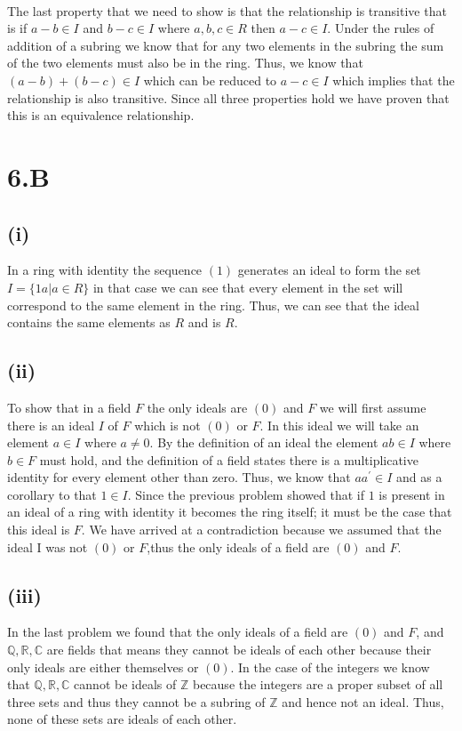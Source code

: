 \documentclass{article}
\begin{document}
      \paragraph{} The last property that we need to show is that the relationship is transitive that is if $a-b \in I$ and $b-c \in I$ where $a,b,c \in R$ then $a-c \in I$. Under the rules of addition of a subring we know that for any two elements in the subring the sum of the two elements must also be in the ring. Thus, we know that $(a-b) + (b-c) \in I$ which can be reduced to $a-c \in I$ which implies that the relationship is also transitive. Since all three properties hold we have proven that this is an equivalence relationship.

  \section*{6.B}
      \subsection*{(i)}
        In a ring with identity the sequence $(1)$ generates an ideal to form the set $I = \{1a | a \in R\}$ in that case we can see that every element in the set will correspond to the same element in the ring. Thus, we can see that the ideal contains the same elements as $R$ and is $R$.

      \subsection*{(ii)}
        To show that in a field $F$ the only ideals are $(0)$ and $F$ we will first assume there is an ideal $I$ of $F$ which is not $(0)$ or $F$. In this ideal we will take an element $a \in I$ where $a \neq 0$. By the definition of an ideal the element $ab \in I$ where $b \in F$ must hold, and the definition of a field states there is a multiplicative identity for every element other than zero. Thus, we know that $aa^{\prime} \in I$ and as a corollary to that $1 \in I$. Since the previous problem showed that if $1$ is present in an ideal of a ring with identity it becomes the ring itself; it must be the case that this ideal is $F$. We have arrived at a contradiction because we assumed that the ideal I was not $(0)$ or $F$,thus the only ideals of a field are $(0)$ and $F$.

      \subsection*{(iii)}
        In the last problem we found that the only ideals of a field are $(0)$ and $F$, and $\mathbb{Q}, \mathbb{R}, \mathbb{C}$ are fields that means they cannot be ideals of each other because their only ideals are either themselves or $(0)$. In the case of the integers we know that $\mathbb{Q}, \mathbb{R}, \mathbb{C}$ cannot be ideals of $\mathbb{Z}$ because the integers are a proper subset of all three sets and thus they cannot be a subring of $\mathbb{Z}$ and hence not an ideal. Thus, none of these sets are ideals of each other.
\end{document}

